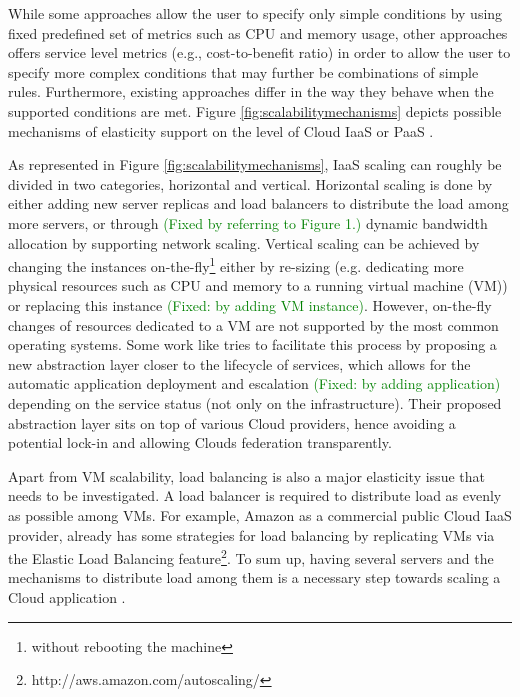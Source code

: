 \documentclass{sig-alternate}
\newcommand\todo[1]{\textcolor{red}{(#1)}}
\newcommand\done[1]{\textcolor{green}{(#1)}}
\begin{document}
While some approaches allow the user to specify only simple conditions by using fixed predefined set of metrics such as CPU and memory usage, other approaches offers service level metrics (e.g., cost-to-benefit ratio) in order to allow the user to specify more complex conditions that may further be combinations of simple rules. Furthermore, existing approaches differ in the way they behave when the supported conditions are met. Figure \ref{fig:scalabilitymechanisms} depicts possible mechanisms of elasticity support on the level of Cloud IaaS or PaaS \cite{vaquero2011dynamically}.

As represented in Figure \ref{fig:scalabilitymechanisms}, IaaS scaling can roughly be divided in two categories, horizontal and vertical. Horizontal scaling is done by either adding new server replicas and load balancers to distribute the load among more servers, or through %
\done{Fixed by referring to Figure 1.} dynamic bandwidth allocation by supporting network scaling. 
Vertical scaling can be achieved by changing the instances on-the-fly\footnote{without rebooting the machine} either by re-sizing (e.g. dedicating more physical resources such as CPU and memory to a running virtual machine (VM)) or replacing this instance %
\done{Fixed: by adding VM instance}. However, on-the-fly changes of resources dedicated to a VM are not supported by the most common operating systems. Some work like \cite{rodero2010infrastructure} tries to facilitate this process by proposing a new abstraction layer closer to the lifecycle of services, which allows for the automatic application deployment and escalation %
\done{Fixed: by adding application} depending on the service status (not only on the infrastructure). Their proposed abstraction layer sits on top of various Cloud providers, hence avoiding a potential lock-in and allowing Clouds federation transparently.

Apart from VM scalability, load balancing is also a major elasticity issue that needs to be investigated. A load balancer is required to distribute load as evenly as possible among VMs. For example, Amazon as a commercial public Cloud IaaS provider, already has some strategies for load balancing by replicating VMs via the Elastic Load Balancing feature\footnote{http://aws.amazon.com/autoscaling/}. To sum up, having several servers and the mechanisms to distribute load among them is a necessary step towards scaling a Cloud application \cite{rodero2010infrastructure}. 
\end{document}

